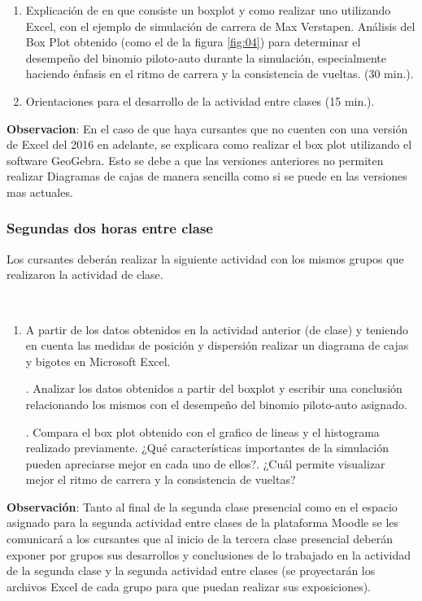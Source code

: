 \begin{enumerate}
	\item Explicación de en que consiste un boxplot y como realizar uno utilizando Excel, con el ejemplo de simulación de carrera de Max Verstapen. Análisis del Box Plot obtenido (como el de la figura \ref{fig:04}) para determinar el desempeño del binomio piloto-auto durante la simulación, especialmente haciendo énfasis en el ritmo de carrera y la consistencia de vueltas. (30 min.). 
	
	\item Orientaciones para el desarrollo de la actividad entre clases (15 min.). 
\end{enumerate}

\textbf{Observacion}: En el caso de que haya cursantes que no cuenten con una versión de Excel del 2016 en adelante, se explicara como realizar el box plot utilizando el software GeoGebra. Esto se debe a que las versiones anteriores no permiten realizar Diagramas de cajas de manera sencilla como si se puede en las versiones mas actuales.

\subsubsection{Segundas dos horas entre clase}

Los cursantes deberán realizar la siguiente actividad con los mismos grupos que realizaron la actividad de clase.

\begin{actividad_entre}
	~
	\begin{enumerate}
		\item A partir de los datos obtenidos en la actividad anterior (de clase) y teniendo en cuenta las medidas de posición y dispersión realizar un diagrama de cajas y bigotes en Microsoft Excel.
		
		. Analizar los datos obtenidos a partir del boxplot y escribir una conclusión relacionando los mismos con el desempeño del binomio piloto-auto asignado.
		
		. Compara el box plot obtenido con el grafico de lineas y el histograma realizado previamente. ¿Qué características importantes de la simulación pueden apreciarse mejor en cada uno de ellos?. ¿Cuál permite visualizar mejor el ritmo de carrera y la consistencia de vueltas?
	\end{enumerate}
\end{actividad_entre}

\textbf{Observación}: Tanto al final de la segunda clase presencial como en el espacio asignado para la segunda actividad entre clases de la plataforma Moodle se les comunicará a los cursantes que al inicio de la tercera clase presencial deberán exponer por grupos sus desarrollos y conclusiones de lo trabajado en la actividad de la segunda clase y la segunda actividad entre clases (se proyectarán los archivos Excel de cada grupo para que puedan realizar sus exposiciones).

